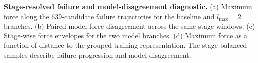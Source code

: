 \caption{\textbf{Stage-resolved failure and model-disagreement diagnostic.} (a) Maximum force along the 639-candidate failure trajectories for the baseline and $l_{\max}=2$ branches. (b) Paired model force disagreement across the same stage windows. (c) Stage-wise force envelopes for the two model branches. (d) Maximum force as a function of distance to the grouped training representation. The stage-balanced samples describe failure progression and model disagreement.}
